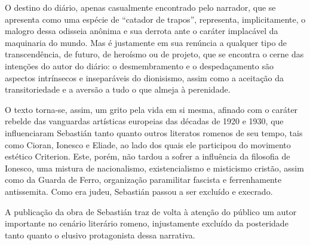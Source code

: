 O destino do diário, apenas casualmente encontrado pelo narrador, que se
apresenta como uma espécie de ``catador de trapos'', representa,
implicitamente, o malogro dessa odisseia anônima e sua derrota ante o
caráter implacável da maquinaria do mundo. Mas é justamente em sua
renúncia a qualquer tipo de transcendência, de futuro, de heroísmo ou de
projeto, que se encontra o cerne das intenções do autor do diário: o
desmembramento e o despedaçamento são aspectos intrínsecos e
inseparáveis do dionisismo, assim como a aceitação da transitoriedade e
a aversão a tudo o que almeja à perenidade.

O texto torna-se, assim, um grito pela vida em si mesma, afinado com o
caráter rebelde das vanguardas artísticas europeias das décadas de 1920
e 1930, que influenciaram Sebastián tanto quanto outros literatos
romenos de seu tempo, tais como Cioran, Ionesco e Eliade, ao lado dos
quais ele participou do movimento estético Criterion. Este, porém, não
tardou a sofrer a influência da filosofia de Ionesco, uma mistura de
nacionalismo, existencialismo e misticismo cristão, assim como da Guarda
de Ferro, organização paramilitar fascista e ferrenhamente antissemita.
Como era judeu, Sebastián passou a ser excluído e execrado.

A publicação da obra de Sebastián traz de volta à atenção do público um
autor importante no cenário literário romeno, injustamente excluído da
posteridade tanto quanto o elusivo protagonista dessa narrativa.
